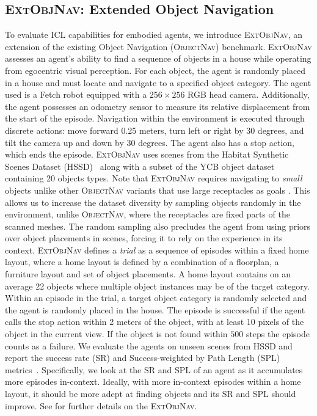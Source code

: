 \documentclass{article}
\newcommand{\task}{\textsc{ExtObjNav}\xspace}
\newcommand{\obnav}{\textsc{ObjectNav}\xspace}
\newcommand{\Task}{Extended Object Navigation\xspace}
\begin{document}
\subsection{\task: \Task}
To evaluate ICL capabilities for embodied agents, we introduce \task, an extension of the existing Object Navigation (\obnav) benchmark. \task assesses an agent's ability to find a sequence of objects in a house while operating from egocentric visual perception. For each object, the agent is randomly placed in a house and must locate and navigate to a specified object category. The agent used is a Fetch robot equipped with a $256 \times 256$ RGB head camera. Additionally, the agent possesses an odometry sensor to measure its relative displacement from the start of the episode. Navigation within the environment is executed through discrete actions: move forward 0.25 meters, turn left or right by 30 degrees, and tilt the camera up and down by 30 degrees. The agent also has a stop action, which ends the episode.
\task uses scenes from the Habitat Synthetic Scenes Dataset (HSSD)~\citep{khanna2023habitat} along with a subset of the YCB object dataset~\citep{calli2015ycb} containing 20 objects types.
Note that \task requires navigating to \emph{small} objects unlike other \obnav variants that use large receptacles as goals \citep{habitat-challenge-2021}. This allows us to increase the dataset diversity by sampling objects randomly in the environment, unlike \obnav, where the receptacles are fixed parts of the scanned meshes. The random sampling also precludes the agent from using priors over object placements in scenes, forcing it to rely on the experience in its context.
\task defines a \emph{trial} as a sequence of episodes within a fixed home layout, where a home layout is defined by a combination of a floorplan, a furniture layout and set of object placements. A home layout contains on an average 22 objects where multiple object instances may be of the target category. Within an episode in the trial, a target object category is randomly selected and the agent is randomly placed in the house. The episode is successful if the agent calls the stop action within 2 meters of the object, with at least 10 pixels of the object in the current view. If the object is not found within $500$ steps the episode counts as a failure.
We evaluate the agents on unseen scenes from HSSD and report the success rate (SR) and Success-weighted by Path Length (SPL) metrics~\citep{anderson2018evaluation}. Specifically, we look at the SR and SPL of an agent as it accumulates more episodes in-context. Ideally, with more in-context episodes within a home layout, it should be more adept at finding objects and its SR and SPL should improve. See  for further details on the \task.
\end{document}
